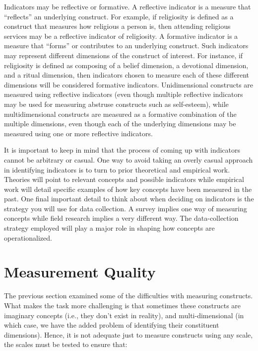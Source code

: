 Indicators may be reflective or formative. A reflective indicator is a measure that ``reflects'' an underlying construct. For example, if religiosity is defined as a construct that measures how religious a person is, then attending religious services may be a reflective indicator of religiosity. A formative indicator is a measure that ``forms'' or contributes to an underlying construct. Such indicators may represent different dimensions of the construct of interest. For instance, if religiosity is defined as composing of a belief dimension, a devotional dimension, and a ritual dimension, then indicators chosen to measure each of these different dimensions will be considered formative indicators. Unidimensional constructs are measured using reflective indicators (even though multiple reflective indicators may be used for measuring abstruse constructs such as self-esteem), while multidimensional constructs are measured as a formative combination of the multiple dimensions, even though each of the underlying dimensions may be measured using one or more reflective indicators.

It is important to keep in mind that the process of coming up with indicators cannot be arbitrary or casual. One way to avoid taking an overly casual approach in identifying indicators is to turn to prior theoretical and empirical work. Theories will point to relevant concepts and possible indicators while empirical work will detail specific examples of how key concepts have been measured in the past. One final important detail to think about when deciding on indicators is the strategy you will use for data collection. A survey implies one way of measuring concepts while field research implies a very different way. The data-collection strategy employed will play a major role in shaping how concepts are operationalized.

\section{Measurement Quality}

The previous section examined some of the difficulties with measuring constructs. What makes the task more challenging is that sometimes these constructs are imaginary concepts (i.e., they don’t exist in reality), and multi-dimensional (in which case, we have the added problem of identifying their constituent dimensions). Hence, it is not adequate just to measure constructs using any scale, the scales must be tested to ensure that: 

